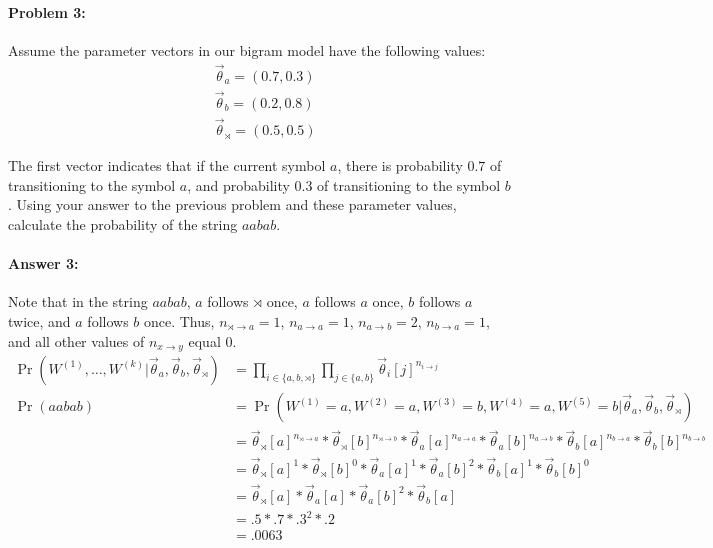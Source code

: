 \documentclass[10pt]{article}
\begin{document}
\hrulefill
\paragraph{Problem 3:}


Assume the parameter vectors in our bigram model have the following values:
\begin{align*}
&\vec{\theta}_{a} = (0.7,0.3)\\
&\vec{\theta}_{b} = (0.2,0.8)\\
&\vec{\theta}_{\rtimes} = (0.5,0.5)
\end{align*}

\noindent The first vector indicates that if the current symbol $a$,
there is probability $0.7$ of transitioning to the symbol $a$, and
probability $0.3$ of transitioning to the symbol $b$. Using your
answer to the previous problem and these parameter values, calculate
the probability of the string $aabab$.

\paragraph{Answer 3:} Note that in the string $aabab$, $a$ follows $\rtimes$ once, $a$ follows $a$ once, $b$ follows $a$ twice, and $a$ follows $b$ once. Thus, $n_{\rtimes \rightarrow a}=1$, $n_{a 
\rightarrow a}=1$, $n_{a \rightarrow b}=2$, $n_{b \rightarrow a}=1$, and all other values of $n_{x \rightarrow y}$ equal 0.
\begin{equation*}
    \begin{split}
        \Pr(W^{(1)},\dots,W^{(k)} | \vec{\theta}_{a}, \vec{\theta}_{b}, \vec{\theta}_{\rtimes}) &=
        \prod_{i \in \{a,b,\rtimes\}} \prod_{j \in \{a,b\}} \vec{\theta}_{i}[j]^{n_{i \rightarrow j}}\\
        \Pr(aabab) &=
        \Pr(W^{(1)}=a,W^{(2)}=a,W^{(3)}=b,W^{(4)}=a,W^{(5)}=b | \vec{\theta}_{a}, \vec{\theta}_{b}, \vec{\theta}_{\rtimes})\\
        &= \vec{\theta}_{\rtimes}[a]^{n_{\rtimes \rightarrow a}} * \vec{\theta}_{\rtimes}[b]^{n_{\rtimes \rightarrow b}} * \vec{\theta}_{a}[a]^{n_{a \rightarrow a}} * \vec{\theta}_{a}[b]^{n_{a \rightarrow b}} * \vec{\theta}_{b}[a]^{n_{b \rightarrow a}} * 
        \vec{\theta}_{b}[b]^{n_{b \rightarrow b}}\\
        &= \vec{\theta}_{\rtimes}[a]^{1} * \vec{\theta}_{\rtimes}[b]^{0} * \vec{\theta}_{a}[a]^{1} * \vec{\theta}_{a}[b]^{2} * \vec{\theta}_{b}[a]^{1} * 
        \vec{\theta}_{b}[b]^{0}\\
        &= \vec{\theta}_{\rtimes}[a] * \vec{\theta}_{a}[a] * \vec{\theta}_{a}[b]^{2} * \vec{\theta}_{b}[a]\\
        &= .5 * .7 * .3^{2} * .2\\
        &= .0063
    \end{split}
\end{equation*}
\end{document}
